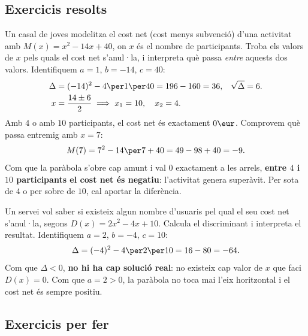 \subsection{Exercicis resolts}

\begin{exresolt}
Un casal de joves modelitza el cost net (cost menys subvenció) d'una
activitat amb $M(x)=x^2-14x+40$, on $x$ és el nombre de participants. Troba
els valors de $x$ pels quals el cost net s'anul·la, i interpreta què passa
\emph{entre} aquests dos valors.
\solucio
Identifiquem $a=1$, $b=-14$, $c=40$:
\begin{align*}
\Delta&=(-14)^2-4\per1\per40=196-160=36, &&\sqrt{\Delta}=6.\\
x&=\frac{14\pm6}{2} \;\Longrightarrow\; x_1=10,\quad x_2=4.
\end{align*}
Amb $4$ o amb $10$ participants, el cost net és exactament $0\eur$.
Comprovem què passa entremig amb $x=7$:
\[
M(7)=7^2-14\per7+40=49-98+40=-9.
\]
Com que la paràbola s'obre cap amunt i val $0$ exactament a les arrels,
\textbf{entre $4$ i $10$ participants el cost net és negatiu}: l'activitat
genera superàvit. Per sota de $4$ o per sobre de $10$, cal aportar la
diferència.
\end{exresolt}

\begin{exresolt}
Un servei vol saber si existeix algun nombre d'usuaris pel qual el seu cost
net s'anul·la, segons $D(x)=2x^2-4x+10$. Calcula el discriminant i interpreta
el resultat.
\solucio
Identifiquem $a=2$, $b=-4$, $c=10$:
\[
\Delta=(-4)^2-4\per2\per10=16-80=-64.
\]
Com que $\Delta<0$, \textbf{no hi ha cap solució real}: no existeix cap
valor de $x$ que faci $D(x)=0$. Com que $a=2>0$, la paràbola no toca mai
l'eix horitzontal i el cost net és sempre positiu.
\end{exresolt}

\subsection{Exercicis per fer}

